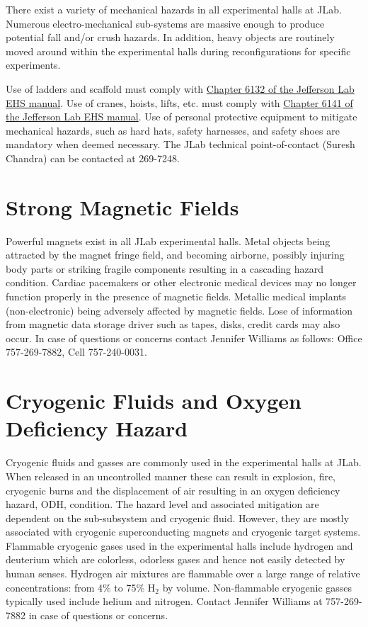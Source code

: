 	There exist a variety of mechanical hazards in all experimental halls at JLab. 
Numerous electro-mechanical sub-systems are massive enough to produce potential fall 
and/or crush hazards.  In addition, heavy objects are routinely moved around within 
the experimental halls during reconfigurations for specific experiments. 

Use of ladders and scaffold must comply 
with \href{http://www.jlab.org/ehs/ehsmanual/manual/6132.html}{Chapter 6132 of the 
Jefferson Lab EHS manual}.
Use of cranes, hoists, lifts, etc. must comply with
\href{http://www.jlab.org/ehs/ehsmanual/manual/6141.html}{Chapter 6141 of the 
Jefferson Lab EHS manual}. 
Use of personal protective equipment 
to mitigate mechanical hazards, such as hard hats, safety harnesses, and safety 
shoes are mandatory when deemed necessary.
The JLab technical point-of-contact (Suresh Chandra) can be contacted at 269-7248.

\section{Strong Magnetic Fields}

	Powerful magnets exist in all JLab experimental halls. Metal objects being attracted 
by the magnet fringe field, and becoming airborne, possibly injuring body parts or striking 
fragile components resulting in a cascading hazard condition. Cardiac pacemakers or other 
electronic medical devices may no longer function properly in the presence of magnetic fields. 
Metallic medical implants (non-electronic) being adversely affected by magnetic fields. Lose of 
information from magnetic data storage driver such as tapes, disks, credit cards may also occur. 
In case of questions or concerns
contact Jennifer Williams as follows: Office 757-269-7882, Cell 757-240-0031.

\section{Cryogenic Fluids and Oxygen Deficiency Hazard}

	Cryogenic fluids and gasses are commonly used in the experimental halls at JLab. 
When released in an uncontrolled manner these can result in explosion, fire, cryogenic 
burns and the displacement of air resulting in an oxygen deficiency hazard, ODH, condition. The hazard level and 
associated mitigation are dependent on the sub-subsystem and cryogenic fluid. However, 
they are mostly associated with cryogenic superconducting magnets and cryogenic target systems. 
Flammable cryogenic gases used in the experimental halls include hydrogen and deuterium which 
are colorless, odorless gases and hence not easily detected by human senses. Hydrogen air 
mixtures are flammable over a large range of relative concentrations: from 4\% to 75\% $\textrm{H}_2$ by volume. 
Non-flammable cryogenic gasses typically used include helium and nitrogen.
Contact Jennifer Williams at 757-269-7882 in case of questions or concerns.   

